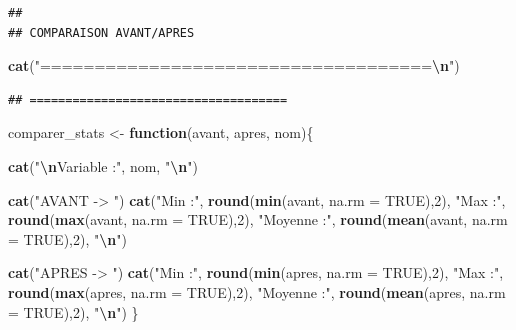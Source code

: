 \documentclass[
]{article}
\newenvironment{Shaded}{\begin{snugshade}}{\end{snugshade}}
\newcommand{\AttributeTok}[1]{\textcolor[rgb]{0.13,0.29,0.53}{#1}}
\newcommand{\ConstantTok}[1]{\textcolor[rgb]{0.56,0.35,0.01}{#1}}
\newcommand{\ControlFlowTok}[1]{\textcolor[rgb]{0.13,0.29,0.53}{\textbf{#1}}}
\newcommand{\DecValTok}[1]{\textcolor[rgb]{0.00,0.00,0.81}{#1}}
\newcommand{\FunctionTok}[1]{\textcolor[rgb]{0.13,0.29,0.53}{\textbf{#1}}}
\newcommand{\NormalTok}[1]{#1}
\newcommand{\OtherTok}[1]{\textcolor[rgb]{0.56,0.35,0.01}{#1}}
\newcommand{\SpecialCharTok}[1]{\textcolor[rgb]{0.81,0.36,0.00}{\textbf{#1}}}
\newcommand{\StringTok}[1]{\textcolor[rgb]{0.31,0.60,0.02}{#1}}
\begin{document}
\begin{verbatim}
## 
## COMPARAISON AVANT/APRES
\end{verbatim}

\begin{Shaded}
\begin{Highlighting}[]
\FunctionTok{cat}\NormalTok{(}\StringTok{"====================================}\SpecialCharTok{\textbackslash{}n}\StringTok{"}\NormalTok{)}
\end{Highlighting}
\end{Shaded}

\begin{verbatim}
## ====================================
\end{verbatim}

\begin{Shaded}
\begin{Highlighting}[]
\NormalTok{comparer\_stats }\OtherTok{\textless{}{-}} \ControlFlowTok{function}\NormalTok{(avant, apres, nom)\{}

\FunctionTok{cat}\NormalTok{(}\StringTok{"}\SpecialCharTok{\textbackslash{}n}\StringTok{Variable :"}\NormalTok{, nom, }\StringTok{"}\SpecialCharTok{\textbackslash{}n}\StringTok{"}\NormalTok{)}

\FunctionTok{cat}\NormalTok{(}\StringTok{"AVANT {-}\textgreater{} "}\NormalTok{)}
\FunctionTok{cat}\NormalTok{(}\StringTok{"Min :"}\NormalTok{, }\FunctionTok{round}\NormalTok{(}\FunctionTok{min}\NormalTok{(avant, }\AttributeTok{na.rm =} \ConstantTok{TRUE}\NormalTok{),}\DecValTok{2}\NormalTok{),}
\StringTok{"Max :"}\NormalTok{, }\FunctionTok{round}\NormalTok{(}\FunctionTok{max}\NormalTok{(avant, }\AttributeTok{na.rm =} \ConstantTok{TRUE}\NormalTok{),}\DecValTok{2}\NormalTok{),}
\StringTok{"Moyenne :"}\NormalTok{, }\FunctionTok{round}\NormalTok{(}\FunctionTok{mean}\NormalTok{(avant, }\AttributeTok{na.rm =} \ConstantTok{TRUE}\NormalTok{),}\DecValTok{2}\NormalTok{), }\StringTok{"}\SpecialCharTok{\textbackslash{}n}\StringTok{"}\NormalTok{)}

\FunctionTok{cat}\NormalTok{(}\StringTok{"APRES {-}\textgreater{} "}\NormalTok{)}
\FunctionTok{cat}\NormalTok{(}\StringTok{"Min :"}\NormalTok{, }\FunctionTok{round}\NormalTok{(}\FunctionTok{min}\NormalTok{(apres, }\AttributeTok{na.rm =} \ConstantTok{TRUE}\NormalTok{),}\DecValTok{2}\NormalTok{),}
\StringTok{"Max :"}\NormalTok{, }\FunctionTok{round}\NormalTok{(}\FunctionTok{max}\NormalTok{(apres, }\AttributeTok{na.rm =} \ConstantTok{TRUE}\NormalTok{),}\DecValTok{2}\NormalTok{),}
\StringTok{"Moyenne :"}\NormalTok{, }\FunctionTok{round}\NormalTok{(}\FunctionTok{mean}\NormalTok{(apres, }\AttributeTok{na.rm =} \ConstantTok{TRUE}\NormalTok{),}\DecValTok{2}\NormalTok{), }\StringTok{"}\SpecialCharTok{\textbackslash{}n}\StringTok{"}\NormalTok{)}
\NormalTok{\}}


\end{Highlighting}
\end{Shaded}
\end{document}
